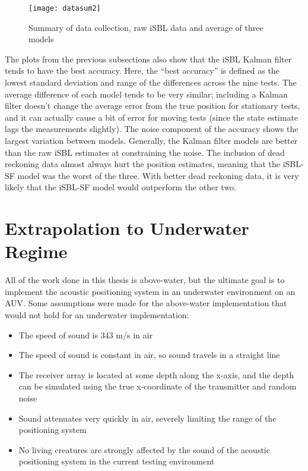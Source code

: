 \documentclass[12pt,a4paper]{report}
\begin{document}
\begin{figure}[htbp]
	\centering
	\texttt{[image: datasum2]}
	\caption{Summary of data collection, raw iSBL data and average of three models}
	\label{fig:datasum2}
\end{figure}

The plots from the previous subsections also show that the iSBL Kalman filter tends to have the best accuracy. Here, the “best accuracy” is defined as the lowest standard deviation and range of the differences across the nine tests. The average difference of each model tends to be very similar; including a Kalman filter doesn’t change the average error from the true position for stationary tests, and it can actually cause a bit of error for moving tests (since the state estimate lags the measurements slightly). The noise component of the accuracy shows the largest variation between models. Generally, the Kalman filter models are better than the raw iSBL estimates at constraining the noise. The inclusion of dead reckoning data almost always hurt the position estimates, meaning that the iSBL-SF model was the worst of the three. With better dead reckoning data, it is very likely that the iSBL-SF model would outperform the other two.

\section{Extrapolation to Underwater Regime} \label{sec:6s3}
All of the work done in this thesis is above-water, but the ultimate goal is to implement the acoustic positioning system in an underwater environment on an AUV. Some assumptions were made for the above-water implementation that would not hold for an underwater implementation:
\begin{itemize}[noitemsep,topsep=0pt,]
	\item The speed of sound is 343 m/s in air
	\item The speed of sound is constant in air, so sound travels in a straight line
	\item The receiver array is located at some depth along the x-axis, and the depth can be simulated using the true x-coordinate of the transmitter and random noise
	\item Sound attenuates very quickly in air, severely limiting the range of the positioning system
	\item No living creatures are strongly affected by the sound of the acoustic positioning system in the current testing environment
\end{itemize}
\end{document}
